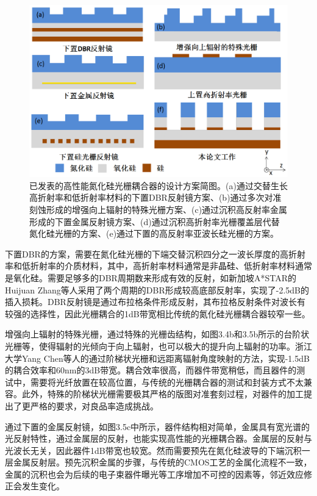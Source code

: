 \begin{figure}[!htbp]
    \centering
    \includegraphics[width=1\textwidth]{Img/3-5.png}
    \caption{已发表的高性能氮化硅光栅耦合器的设计方案简图。(a)通过交替生长高折射率和低折射率材料的下置DBR反射镜方案、(b)通过多次对准刻蚀形成的增强向上辐射的特殊光栅方案、(c)通过沉积高反射率金属形成的下置金属反射镜方案、(d)通过沉积高折射率光栅覆盖层代替氮化硅光栅的方案、(e)通过下置的高反射率亚波长硅光栅的方案。}
    \label{fig:3-5}
\end{figure}

下置DBR的方案，需要在氮化硅光栅的下端交替沉积四分之一波长厚度的高折射率和低折射率的介质材料，其中，高折射率材料通常是非晶硅、低折射率材料通常是氧化硅。需要足够多的DBR周期数来形成有效的反射，如新加坡A*STAR的Huijuan Zhang等人采用了两个周期的DBR形成较高底部反射率，实现了-2.5dB的插入损耗。DBR反射镜是通过布拉格条件形成反射，其布拉格反射条件对波长有较强的选择性，因此光栅耦合的1dB带宽相比传统的氮化硅光栅耦合器较窄一些。

增强向上辐射的特殊光栅，通过特殊的光栅齿结构，如图3.4b和3.5b所示的台阶状光栅等，使得辐射的光倾向于向上辐射，也可以极大的提升向上辐射的功率。浙江大学Yang Chen等人的通过阶梯状光栅和远距离辐射角度映射的方法，实现-1.5dB的耦合效率和60nm的3dB带宽\cite{Chen2016High,Chen2017Experimental}。耦合效率很高，而器件带宽稍低，而且器件的测试中，需要将光纤放置在较高位置，与传统的光栅耦合器的测试和封装方式不太兼容。此外，特殊的阶梯状光栅需要极其严格的版图对准套刻过程，对器件的加工提出了更严格的要求，对良品率造成挑战。

通过下置的金属反射镜，如图3.5c中所示，器件结构相对简单，金属具有宽光谱的光反射特性，通过金属层的反射，也能实现高性能的光栅耦合器。金属层的反射与光波长无关，因此器件1dB带宽也较宽。然而需要预先在氮化硅波导的下端沉积一层金属反射层。预先沉积金属的步骤，与传统的CMOS工艺的金属化流程不一致，金属的沉积也会为后续的电子束器件曝光等工序增加不可控的因素等，邻近效应修正会发生变化。

